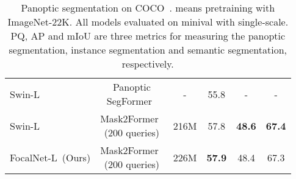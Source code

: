 \documentclass{article}
\begin{document}
\begin{table}[t]
\begin{minipage}{0.52\linewidth}
{\begin{tabular}{lcc|ccc}
    {Swin-L~\cite{liu2021swin}} & \makecell{Panoptic \\ SegFormer~\cite{li2021panoptic}} & - & 55.8 & - & -  \\  
    Swin-L~\cite{liu2021swin} & \makecell{Mask2Former~\cite{cheng2021per} \\ (200 queries)} & 216M & 57.8 & \textbf{48.6} & \textbf{67.4}  \\     
    FocalNet-L~(Ours) & \makecell{Mask2Former~\cite{cheng2021per} \\ (200 queries)} & 226M & \textbf{57.9} & 48.4 & 67.3  \\ 
    \bottomrule
  \end{tabular} 
  }
  \captionsetup{font=footnotesize}    
  \caption{Panoptic segmentation on COCO~\cite{lin2014microsoft}.  means pretraining with ImageNet-22K. All models evaluated on minival with single-scale. PQ, AP and mIoU are three metrics for measuring the panoptic segmentation, instance segmentation and semantic segmentation, respectively.}
  \label{tab:panoptic_segmentation}    
\end{minipage}
\end{table}
\end{document}
